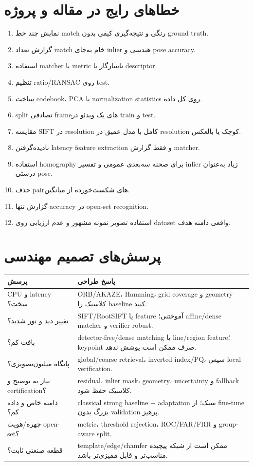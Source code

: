 \documentclass[12pt,openany,oneside]{book}
\begin{document}
\section{خطاهای رایج در مقاله و پروژه}
\begin{enumerate}
\item نمایش چند خط match رنگی و نتیجه‌گیری کیفی بدون ground truth.
\item گزارش تعداد match خام به‌جای inlier هندسی و pose accuracy.
\item استفاده matcher یا metric ناسازگار با descriptor.
\item تنظیم ratio/RANSAC روی test.
\item ساخت codebook، PCA یا normalization statistics روی کل داده.
\item split تصادفی frameهای یک ویدئو در train و test.
\item مقایسه SIFT در resolution کامل با مدل عمیق در resolution کوچک یا بالعکس.
\item نادیده‌گرفتن latency feature extraction و فقط گزارش matcher.
\item استفاده homography برای صحنه سه‌بعدی عمومی و تفسیر inlier زیاد به‌عنوان درستی pose.
\item حذف pairهای شکست‌خورده از میانگین.
\item گزارش تنها accuracy در open-set recognition.
\item استفاده تصویر نمونه مشهور و عدم ارزیابی روی dataset واقعی دامنه هدف.
\end{enumerate}

\section{پرسش‌های تصمیم مهندسی}
\begin{longtable}{p{48mm}p{91mm}}
\toprule
پرسش & پاسخ طراحی \\
\midrule
CPU و latency سخت؟ & ORB/AKAZE، Hamming، grid coverage و geometry کلاسیک را baseline کنید. \\
تغییر دید و نور شدید؟ & SIFT/RootSIFT یا feature آموختنی؛ affine/dense matcher و verifier robust. \\
بافت کم؟ & detector-free/dense matching یا line/region feature؛ keypoint صرف ممکن است پوشش ندهد. \\
پایگاه میلیون‌تصویری؟ & global/coarse retrieval، inverted index/PQ، سپس local verification. \\
نیاز به توضیح و certification؟ & residual، inlier mask، geometry، uncertainty و fallback کلاسیک حفظ شود. \\
دامنه خاص و داده کم؟ & classical strong baseline + adaptation سبک؛ از fine-tune بزرگ بدون validation پرهیز. \\
چهره/هویت open-set؟ & metric، threshold rejection، ROC/FAR/FRR و group-aware split. \\
قطعه صنعتی ثابت؟ & template/edge/chamfer ممکن است از شبکه پیچیده مناسب‌تر و قابل ممیزی‌تر باشد. \\
\bottomrule
\end{longtable}
\end{document}
